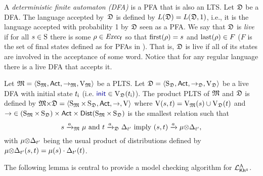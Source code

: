 A \emph{deterministic finite automaton (DFA)} is a PFA that is also an 
LTS. Let $\dfa$ be a DFA.  The language accepted by~$\dfa$ is defined
by $L(\dfa)=L(\dfa,1)$, i.e., it is the language accepted with
probability 1 by $\dfa$ seen as a PFA.
%
We say that $\dfa$ is \emph{live} if for all $s\in\S$ there is some
$\rho\in\execf$ so that $\first(\rho)=s$ and $\last(\rho)\in F$ ($F$
is the set of final states defined as for PFAs in
).  That is, $\dfa$ is live if all of its
states are involved in the acceptance of some word.  Notice that for
any regular language there is a live DFA that accepts it.

Let $\model=\tup{\S_\model,\Act,\ra_\model,\V_\model}$ be a PLTS.
%
Let $\dfa=\tup{\S_\dfa,\Act,\ra_\dfa,\V_\dfa}$ be a live DFA with
initial state $\tini$ (i.e. $\init\in\V_\dfa(\tini)$).  The product
PLTS of $\model$ and $\dfa$ is defined by
$\model{\times}\dfa=\tup{\S_\model{\times}\S_\dfa,\Act,\ra,\V}$
where $\V(s,t)=\V_\model(s)\cup\V_\dfa(t)$ and
${\ra}\in{(\S_\model{\times}\S_\dfa)}\times\Act\times\Dist({\S_\model{\times}\S_\dfa})$
is the smallest relation such that
%
\[s\reach{a}_\model\mu \text{ and } t\reach{a}_\dfa\Dirac_{t'} \text{ imply } (s,t)\reach{a}{\mu{\otimes}\Dirac_{t'}},\]
%
with $\mu{\otimes}\Dirac_{t'}$ being the usual product of distributions
defined by $\mu{\otimes}\Dirac_{t'}(s,t)= \mu(s)\cdot\Dirac_{t'}(t)$.


The following lemma is central to provide a model checking
algorithm for $\PKhadapt$.

